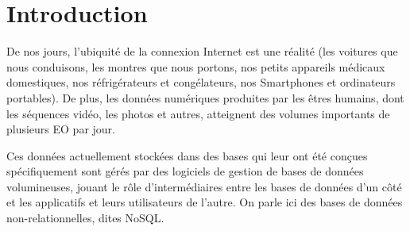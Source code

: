 \section*{Introduction}
De nos jours, l’ubiquité de la connexion Internet est une réalité (les voitures que nous conduisons, les montres que nous portons, nos petits appareils médicaux domestiques, nos réfrigérateurs et congélateurs, nos Smartphones et ordinateurs portables). De plus, les données numériques produites par les êtres humains, dont les séquences vidéo, les photos et autres, atteignent des volumes importants de plusieurs EO par jour. 

Ces données actuellement stockées dans des bases qui leur ont été conçues spécifiquement sont gérés par des logiciels de gestion de bases de données volumineuses, jouant le rôle d’intermédiaires entre les bases de données d’un côté et les applicatifs et leurs utilisateurs de l’autre. On parle ici des bases de données non-relationnelles, dites NoSQL.
